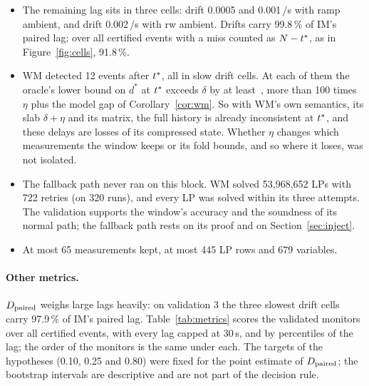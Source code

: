 \begin{itemize}
  consistent under the exact model.
\item The remaining lag sits in three cells: drift 0.0005 and 0.001\,\degC/s with ramp ambient, and drift
  0.002\,\degC/s with rw ambient. Drifts carry 99.8\,\% of IM's paired lag; over all certified events with
  a miss counted as $N-t^{\ast}$, as in Figure~\ref{fig:cells}, 91.8\,\%.
\item WM detected 12 events after $t^{\ast}$, all in slow drift cells. At each of them the oracle's lower bound on $d^\ast$
  at $t^{\ast}$ exceeds $\delta$ by at least \,\degC, more than 100 times $\eta$ plus the model gap of
  Corollary~\ref{cor:wm}. So with WM's own semantics, its slab $\delta+\eta$ and its matrix, the full history is
  already inconsistent at $t^{\ast}$, and these delays are losses of its compressed state. Whether $\eta$ changes which
  measurements the window keeps or its fold bounds, and so where it loses, was not isolated.
\item The fallback path never ran on this block. WM solved 53,968,652 LPs with 722 retries (on 320 runs), and every LP was solved
  within its three attempts. The validation supports the window's accuracy and the soundness of its normal path; the
  fallback path rests on its proof and on Section~\ref{sec:inject}.
\item At most 65 measurements kept, at most 445 LP rows and 679 variables.
\end{itemize}

\paragraph{Other metrics.} $D_{\mathrm{paired}}$ weighs large lags heavily: on validation 3 the three slowest drift cells carry
97.9\,\% of IM's paired lag. Table~\ref{tab:metrics} scores the validated monitors over all certified events, with
every lag capped at 30\,s, and by percentiles of the lag; the order of the monitors is the same under each. The
targets of the hypotheses (0.10, 0.25 and 0.80) were fixed for the point estimate of $D_{\mathrm{paired}}$; the bootstrap intervals are
descriptive and are not part of the decision rule.

